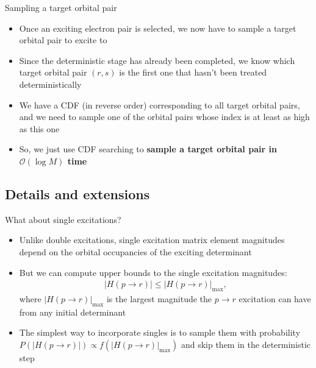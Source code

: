 \documentclass[amsmath]{beamer}
\begin{document}
\begin{frame}{Sampling a target orbital pair}
	\begin{itemize}
		\item Once an exciting electron pair is selected, we now have to sample a target orbital pair to excite to
		\item Since the deterministic stage has already been completed, we know which target orbital pair $(r,s)$ is the first one that hasn't been treated deterministically
		\item We have a CDF (in reverse order) corresponding to all target orbital pairs, and we need to sample one of the orbital pairs whose index is at least as high as this one
		\item So, we just use CDF searching to \textbf{sample a target orbital pair in $\mathcal{O}(\log M)$ time}
	\end{itemize}
\end{frame}

\subsection{Details and extensions}
\begin{frame}{What about single excitations?}
	\begin{itemize}
		\item Unlike double excitations, single excitation matrix element magnitudes depend on the orbital occupancies of the exciting determinant
		\item But we can compute upper bounds to the single excitation magnitudes:
		\begin{eqnarray}
			\left|H(p\rightarrow r)\right| %
			\le \left|H(p\rightarrow r)\right|_{\max},%
		\end{eqnarray}
		where $|H(p\rightarrow r)|_{\max}$ is the largest magnitude the $p\rightarrow r$ excitation can have from any initial determinant
		\item The simplest way to incorporate singles is to sample them with probability $P(|H(p\rightarrow r)|) \propto f(|H(p\rightarrow r)|_{\max})$ and skip them in the deterministic step
	\end{itemize}
\end{frame}
\end{document}
